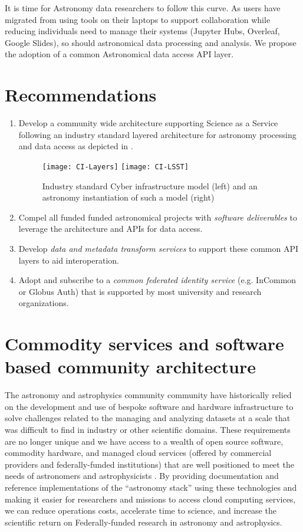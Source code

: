 It is time for Astronomy data researchers to follow this curve. As users have migrated
from using tools on their laptops to support collaboration while reducing
individuals need to manage their systems (Jupyter Hubs, Overleaf, Google Slides),
so should astronomical data processing and analysis. We propose the adoption of
a common Astronomical data access \gls{API} layer.


\section{Recommendations }
\begin{enumerate}
 \item Develop a community wide architecture supporting Science as a Service following
	an industry  standard layered architecture for astronomy processing and data access as
depicted in .


\begin{figure}
\centering
\texttt{[image: CI-Layers]}
\texttt{[image: CI-LSST]}
\caption{Industry standard Cyber infrastructure model (left) and an astronomy instantiation of such a model (right)\label{fig:ci}}
\end{figure}

\item Compel all funded funded astronomical projects with \emph{software deliverables} to  leverage the architecture and  APIs for data access.

\item Develop \emph{data and \gls{metadata} transform services}
to support these common \gls{API} layers to aid interoperation.

\item Adopt and subscribe to a \emph{common federated identity service} (e.g. InCommon or
Globus Auth) that is supported by most university and research organizations.
\end{enumerate}




\section{Commodity services and software based community architecture} \label{sec:refarc}
The astronomy and astrophysics community community have historically relied on the development and use of bespoke software and hardware infrastructure to solve challenges related to the managing and analyzing datasets at a scale that was difficult to find in industry or other scientific domains.
These requirements are no longer unique and we have access to a wealth of open source software, commodity hardware, and managed cloud services (offered by commercial providers and federally-funded institutions) that are well positioned to meet the needs of astronomers and astrophysicists \cite{2019AAS...23345706M, 2019AAS...23324505B}.
By providing documentation and reference implementations of the “astronomy stack” using these technologies and making it easier for researchers and missions to access cloud computing services, we can reduce operations costs, accelerate time to science, and increase the scientific return on Federally-funded research in astronomy and astrophysics.


